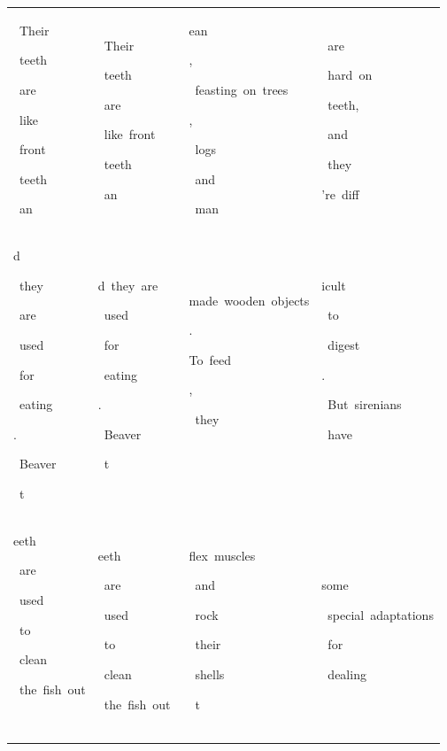 \begin{table}[h]
\begin{tabular}{ l | l | l | l }
 \colorbox{cm_31!40}{\strut \ Their}\colorbox{cm_32!40}{\strut \ teeth}\colorbox{cm_34!40}{\strut \ are}\colorbox{cm_31!40}{\strut \ like}\colorbox{cm_25!40}{\strut \ front}\colorbox{cm_12!40}{\strut \ teeth}\colorbox{cm_30!40}{\strut \ an} & \colorbox{cm_25!40}{\strut \ Their}\colorbox{cm_12!40}{\strut \ teeth}\colorbox{cm_25!40}{\strut \ are}\colorbox{cm_12!40}{\strut \ like\ front}\colorbox{cm_25!40}{\strut \ teeth}\colorbox{cm_12!40}{\strut \ an} & \colorbox{cm_0!40}{\strut ean}\colorbox{cm_12!40}{\strut ,}\colorbox{cm_0!40}{\strut \ feasting\ on\ trees}\colorbox{cm_12!40}{\strut ,}\colorbox{cm_0!40}{\strut \ logs}\colorbox{cm_12!40}{\strut \ and}\colorbox{cm_0!40}{\strut \ man} & \colorbox{cm_12!40}{\strut \ are}\colorbox{cm_0!40}{\strut \ hard\ on}\colorbox{cm_12!40}{\strut \ teeth,}\colorbox{cm_25!40}{\strut \ and}\colorbox{cm_12!40}{\strut \ they}\colorbox{cm_0!40}{\strut 're\ diff} \\ 
 \colorbox{cm_30!40}{\strut d}\colorbox{cm_29!40}{\strut \ they}\colorbox{cm_32!40}{\strut \ are}\colorbox{cm_31!40}{\strut \ used}\colorbox{cm_27!40}{\strut \ for}\colorbox{cm_32!40}{\strut \ eating}\colorbox{cm_39!40}{\strut .}\colorbox{cm_36!40}{\strut \ Beaver}\colorbox{cm_50!40}{\strut \ t} & \colorbox{cm_12!40}{\strut d\ they\ are}\colorbox{cm_25!40}{\strut \ used}\colorbox{cm_12!40}{\strut \ for}\colorbox{cm_0!40}{\strut \ eating}\colorbox{cm_12!40}{\strut .}\colorbox{cm_0!40}{\strut \ Beaver}\colorbox{cm_12!40}{\strut \ t} & \colorbox{cm_0!40}{\strut made\ wooden\ objects}\colorbox{cm_12!40}{\strut .}\colorbox{cm_0!40}{\strut To\ feed}\colorbox{cm_12!40}{\strut ,}\colorbox{cm_25!40}{\strut \ they}\colorbox{cm_0!40}{\strut \ } & \colorbox{cm_0!40}{\strut icult}\colorbox{cm_12!40}{\strut \ to}\colorbox{cm_0!40}{\strut \ digest}\colorbox{cm_12!40}{\strut .}\colorbox{cm_0!40}{\strut \ But\ sirenians}\colorbox{cm_12!40}{\strut \ have}\colorbox{cm_25!40}{\strut \ } \\ 
 \colorbox{cm_50!40}{\strut eeth}\colorbox{cm_31!40}{\strut \ are}\colorbox{cm_32!40}{\strut \ used}\colorbox{cm_31!40}{\strut \ to}\colorbox{cm_21!40}{\strut \ clean}\colorbox{cm_26!40}{\strut \ the\ fish\ out}\colorbox{cm_32!40}{\strut \ } & \colorbox{cm_12!40}{\strut eeth}\colorbox{cm_25!40}{\strut \ are}\colorbox{cm_38!40}{\strut \ used}\colorbox{cm_51!40}{\strut \ to}\colorbox{cm_0!40}{\strut \ clean}\colorbox{cm_12!40}{\strut \ the\ fish\ out\ } & \colorbox{cm_0!40}{\strut flex\ muscles}\colorbox{cm_12!40}{\strut \ and}\colorbox{cm_0!40}{\strut \ rock}\colorbox{cm_12!40}{\strut \ their}\colorbox{cm_0!40}{\strut \ shells}\colorbox{cm_12!40}{\strut \ t} & \colorbox{cm_25!40}{\strut some}\colorbox{cm_0!40}{\strut \ special\ adaptations}\colorbox{cm_12!40}{\strut \ for}\colorbox{cm_0!40}{\strut \ dealing} \\ 

\end{tabular}
\end{table}
